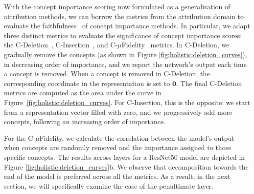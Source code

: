 With the concept importance scoring now formulated as a generalization of attribution methods, we can borrow the metrics from the attribution domain to evaluate the faithfulness~\cite{jacovi2020towards,petsiuk2018rise,aggregating2020} of concept importance methods. In particular, 
we adapt three distinct metrics %
to evaluate the significance of concept importance scores: the C-Deletion~\cite{petsiuk2018rise}, C-Insertion~\cite{petsiuk2018rise}, and C-$\mu$Fidelity~\cite{aggregating2020} metrics.
In C-Deletion, we gradually remove the concepts (as shown in Figure \ref{fig:holistic:deletion_curves}), in decreasing order of importance, and we report the network's output each time a concept is removed. When a concept is removed in C-Deletion, the corresponding coordinate in the representation is set to $\bm{0}$. 
The final C-Deletion metrics are computed as the area under the curve in Figure~\ref{fig:holistic:deletion_curves}. For C-Insertion, this is the opposite: we start from a representation vector filled with zero, and we progressively add more concepts, following an increasing order of importance. 


For the C-$\mu$Fidelity, we calculate the correlation between the model's output when concepts are randomly removed and the importance assigned to those specific concepts.
The results across layers for a ResNet50 model are depicted in Figure \ref{fig:holistic:deletion_curves}b. We observe that decomposition towards the end of the model is preferred across all the metrics. As a result, in the next section, we will specifically examine the case of the penultimate layer.




